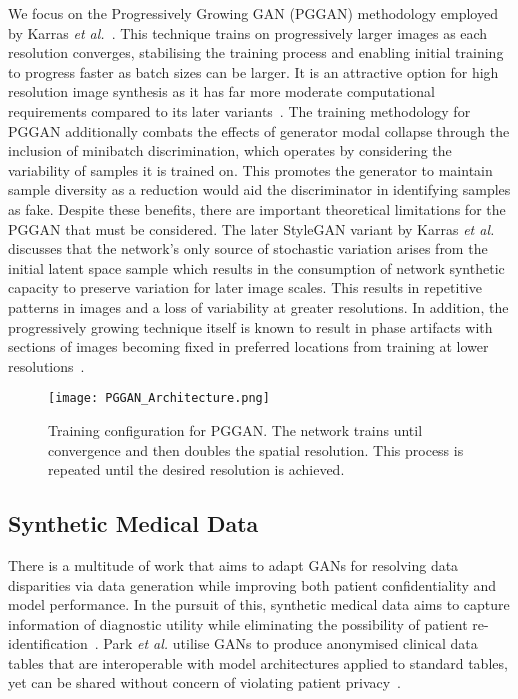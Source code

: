 \documentclass{article}
\begin{document}
We focus on the Progressively Growing GAN (PGGAN) methodology employed by Karras \emph{et al.}~\cite{karrasProgressiveGrowingGANs2018}. This technique trains on progressively larger images as each resolution converges, stabilising the training process and enabling initial training to progress faster as batch sizes can be larger. It is an attractive option for high resolution image synthesis as it has far more moderate computational requirements compared to its later variants~\cite{karrasStyleBasedGeneratorArchitecture2019,karrasAnalyzingImprovingImage2020}. The training methodology for PGGAN additionally combats the effects of generator modal collapse through the inclusion of minibatch discrimination, which operates by considering the variability of samples it is trained on. This promotes the generator to maintain sample diversity as a reduction would aid the discriminator in identifying samples as fake. Despite these benefits, there are important theoretical limitations for the PGGAN that must be considered. The later StyleGAN variant by Karras \emph{et al.}~\cite{karrasStyleBasedGeneratorArchitecture2019} discusses that the network's only source of stochastic variation arises from the initial latent space sample which results in the consumption of network synthetic capacity to preserve variation for later image scales. This results in repetitive patterns in images and a loss of variability at greater resolutions. In addition, the progressively growing technique itself is known to result in phase artifacts with sections of images becoming fixed in preferred locations from training at lower resolutions~\cite{karrasAnalyzingImprovingImage2020}.

\begin{figure}
    \centering
    \texttt{[image: PGGAN\_Architecture.png]}
    \caption{Training configuration for PGGAN. The network trains until convergence and then doubles the spatial resolution. This process is repeated until the desired resolution is achieved.}
    \label{fig:architecture}
\end{figure}

\subsection{Synthetic Medical Data}
There is a multitude of work that aims to adapt GANs for resolving data disparities via data generation while improving both patient confidentiality and model performance. In the pursuit of this, synthetic medical data aims to capture information of diagnostic utility while eliminating the possibility of patient re-identification~\cite{parkDataSynthesisBased2018}. Park \emph{et al.} utilise GANs to produce anonymised clinical data tables that are interoperable with model architectures applied to standard tables, yet can be shared without concern of violating patient privacy~\cite{parkDataSynthesisBased2018}. 
\end{document}
